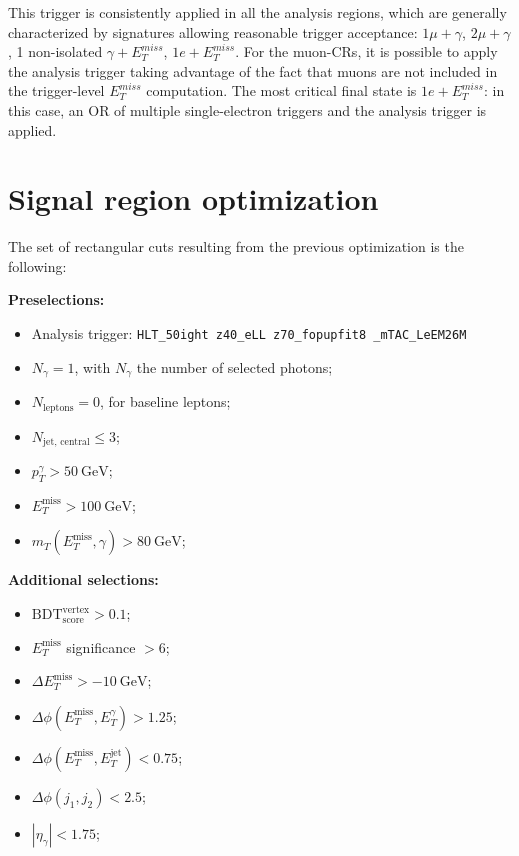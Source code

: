 This trigger is consistently applied in all the analysis regions, which are generally characterized by signatures allowing reasonable trigger acceptance: $1\mu+\gamma$, $2\mu+\gamma$, 1 non-isolated $\gamma+E_{T}^{miss}$, $1e+E_{T}^{miss}$. For the muon-CRs, it is possible to apply the analysis trigger taking advantage of the fact that muons are not included in the trigger-level $E_{T}^{miss}$ computation. The most critical final state is $1e+E_{T}^{miss}$: in this case, an OR of multiple single-electron triggers and the analysis trigger is applied.


\FloatBarrier
\section{Signal region optimization}


The set of rectangular cuts resulting from the previous optimization is the following:

\noindent\textbf{Preselections:}
\begin{itemize}[topsep=2pt, itemsep=2pt, parsep=0pt]
    \item Analysis trigger: \texttt{HLT\_50ight\allowbreak
z40\_eLL\allowbreak
z70\_fopupfit8\allowbreak
\_mTAC\_LeEM26M}
    \item $N_{\gamma} = 1$, with $N_{\gamma}$ the number of selected photons;
    \item $N_{\text{leptons}} = 0$, for baseline leptons;
    \item $N_{\text{jet, central}} \leq 3$;
    \item $p_{T}^{\gamma} > 50~\text{GeV}$;
    \item $E_{T}^{\text{miss}} > 100~\text{GeV}$;
    \item $m_T(E_{T}^{\text{miss}}, \gamma) > 80~\text{GeV}$;
\end{itemize}
\noindent\textbf{Additional selections:}
\begin{itemize}[topsep=2pt, itemsep=2pt, parsep=0pt]
    \item $\mathrm{BDT}^{\text{vertex}}_{\text{score}} > 0.1$;
    \item $E_{T}^{\text{miss}}$ significance $> 6$;
    \item $\Delta E_{T}^{\text{miss}} > -10~\text{GeV}$;
    \item $\Delta \phi(E_{T}^{\text{miss}}, E_{T}^{\gamma}) > 1.25$;
    \item $\Delta \phi(E_{T}^{\text{miss}}, E_{T}^{\text{jet}}) < 0.75$;
    \item $\Delta \phi(j_1, j_2) < 2.5$;
    \item $|\eta_{\gamma}| < 1.75$;
\end{itemize}

